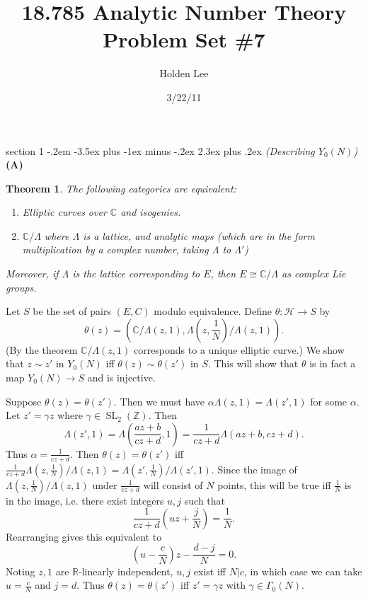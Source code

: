 \documentclass[12pt]{article}
\makeatletter
\theoremstyle{norm}
\newtheorem{thm}{Theorem}[section]
\newcommand{\C}[0]{\mathbb{C}}
\newcommand{\R}[0]{\mathbb{R}}
\newcommand{\Z}[0]{\mathbb{Z}}
\providecommand{\cal}[1]{\mathcal{#1}}
\renewcommand{\cal}[1]{\mathcal{#1}}
\newcommand{\rc}[1]{\frac{1}{#1}}
\newcommand{\sub}[0]{\subset}
\newcommand{\subeq}[0]{\subseteq}
\newcommand{\al}[0]{\alpha}
\newcommand{\ga}[0]{\gamma}
\newcommand{\Ga}[0]{\Gamma}
\newcommand{\La}[0]{\Lambda}
\newcommand{\pa}[1]{\left( {#1} \right)}
\newcommand{\subprob}[1]{\noindent\textbf{#1}\\}
\newcommand{\SL}{\operatorname{SL}}
\newenvironment{problem}{\@startsection
       {section}
       {1}
       {-.2em}
       {-3.5ex plus -1ex minus -.2ex}
       {2.3ex plus .2ex}
       {\pagebreak[3]%
       \large\bf\noindent{Problem }
       }
       }
       {%
       }
\makeatother
\begin{document}
\title{18.785 Analytic Number Theory Problem Set \#7}%
\author{Holden Lee}
\date{3/22/11}%
\maketitle
\thispagestyle{empty}

\begin{problem}{\it (Describing $Y_0(N)$)}
\subprob{(A)}
\begin{thm}\cite[VI.5.1.1, VI.5.3]{silv}
The following categories are equivalent:
\begin{enumerate}
\item
Elliptic curves over $\C$ and isogenies.
\item
$\C/\La$ where $\La$ is a lattice, and analytic maps (which are in the form multiplication by a complex number, taking $\La$ to $\La'$)
\end{enumerate}
Moreover, if $\La$ is the lattice corresponding to $E$, then $E\cong \C/\La$ as complex Lie groups.
\end{thm}
Let $S$ be the set of pairs $(E,C)$ modulo equivalence. Define $\theta:\cal H\to S$ by
\[
\theta(z)=(\C/\La(z,1),\La(z,\rc N)/\La(z,1)).
\]
(By the theorem $\C/\La(z,1)$ corresponds to a unique elliptic curve.)
We show that $z\sim z'$ in $Y_0(N)$ iff $\theta(z)\sim \theta(z')$ in $S$. This will show that $\theta$ is in fact a map $Y_0(N)\to S$ and is injective.

Suppose $\theta(z)=\theta(z')$. Then %
we must have %
$\al \La(z,1)=\La(z',1)$ for some $\al$. Let $z'=\ga z$ where $\ga\in\SL_2(\Z)$.  Then
\[
\La(z',1)=\La\pa{\frac{az+b}{cz+d},1}=\rc{cz+d}\La\pa{az+b,cz+d}.
\]
Thus $\al=\rc{cz+d}$. Then $\theta(z)=\theta(z')$ iff $\rc{cz+d}\La(z,\rc{N})/\La(z,1)=\La(z',\rc{N})/\La(z',1)$. Since the image of $\La(z,\rc{N})/\La(z,1)$ under $\rc{cz+d}$ will consist of $N$ points, this will be true iff $\rc{N}$ is in the image, i.e. there exist integers $u,j$ such that 
\[
\rc{cz+d}\pa{uz+\frac{j}{N}}=\rc{N}.
\]
Rearranging gives this equivalent to
\[
\pa{u-\frac cN}z-\frac{d-j}{N}=0.
\]
Noting $z,1$ are $\R$-linearly independent, $u,j$ exist iff $N|c$, in which case we can take $u=\frac cN$ and $j=d$. Thus $\theta(z)=\theta(z')$ iff $z'=\ga z$ with $\ga\in \Ga_0(N)$.


\end{problem}
\end{document}
